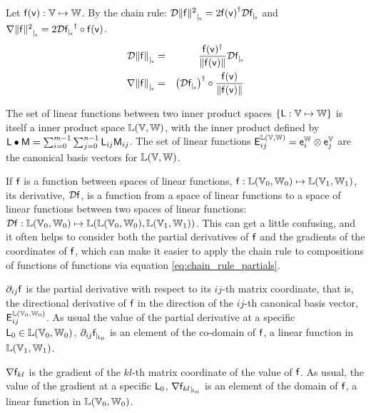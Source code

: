 Let $\mathsf{f}(\mathsf{v}) : \mathbb{V} \mapsto \mathbb{W}$.
By the chain rule:
${\mathcal{D}{\| \mathsf{f} \|^2}_{\mid_{\mathsf{v}}}}  =  2 {\mathsf{f}(\mathsf{v})}^{\dagger} {\mathcal{D}{\mathsf{f}}_{\mid_{\mathsf{v}}}} $
and
${\mathbf \nabla}{\| \mathsf{f} \|^2}_{\mid_{\mathsf{v}}}  =  2 {\mathcal{D}{\mathsf{f}}_{\mid_{\mathsf{v}}}}^\dagger \circ \mathsf{f}(\mathsf{v})$.
\begin{eqnarray}
\label{eq:norm_derivative}
{\mathcal{D}{\| \mathsf{f}\|}_{\mid_{\mathsf{v}}}}
& = &
\frac{\mathsf{f}(\mathsf{v})^\dagger}{\| \mathsf{f}(\mathsf{v}) \|} {\mathcal{D}{\mathsf{f}}_{\mid_{\mathsf{v}}}}  \\
{\mathbf \nabla}{\| \mathsf{f} \|}_{\mid_{\mathsf{v}}}
& = &
\left({\mathcal{D}{\mathsf{f}}_{\mid_{\mathsf{v}}}}\right)^\dagger \circ  \frac{\mathsf{f}(\mathsf{v})}{ \| \mathsf{f}(\mathsf{v})  \|}
\label{eq:norm_gradient}
\end{eqnarray}

\label{sec:Linear-function-valued-functions}

The set of linear functions between two inner product spaces
$\{ \mathsf{L} : \mathbb{V} \mapsto \mathbb{W} \}$
is itself a inner product space $\mathbb{L}(\mathbb{V},\mathbb{W})$,
with the inner product defined by
$\mathsf{L} \bullet \mathsf{M} = \sum_{i=0}^{m-1} \sum_{j=0}^{n-1} \mathsf{L}_{ij} \mathsf{M}_{ij}$.
The set of linear functions
$\mathsf{E}_{ij}^{\mathbb{L}(\mathbb{V},\mathbb{W})}  = \mathsf{e}_i^{\mathbb{W}} \otimes \mathsf{e}_j^{\mathbb{V}}$
are the canonical basis vectors for $\mathbb{L}(\mathbb{V},\mathbb{W})$.

If $\mathsf{f}$ is a function between spaces of linear functions,
$\mathsf{f} : \mathbb{L}(\mathbb{V}_0,\mathbb{W}_0) \mapsto \mathbb{L}(\mathbb{V}_1,\mathbb{W}_1)$,
its derivative, ${\mathcal{D}{\mathsf{f}}}$,
is a function from a space of linear functions
to a space of linear functions between two
spaces of linear functions:
${\mathcal{D}{\mathsf{f}}} : \mathbb{L}(\mathbb{V}_0,\mathbb{W}_0) \mapsto
\mathbb{L}(\mathbb{L}(\mathbb{V}_0,\mathbb{W}_0), \mathbb{L}(\mathbb{V}_1,\mathbb{W}_1))$.
This can get a little confusing,
and it often helps to consider both the partial derivatives of $\mathsf{f}$
and the gradients of the coordinates of $\mathsf{f}$,
which can make it easier to apply the chain rule to
compositions of functions of functions via equation \ref{eq:chain_rule_partials}.

${\partial}_{ij}{\mathsf{f}}$ is the partial derivative with respect to its $ij$-th matrix coordinate,
that is, the directional derivative of $\mathsf{f}$ in the direction
of the $ij$-th canonical basis vector, $\mathsf{E}_{ij}^{\mathbb{L}(\mathbb{V}_0,\mathbb{W}_0)}$.
As usual the value of the partial derivative at a specific
$\mathsf{L}_0 \in  \mathbb{L}(\mathbb{V}_0,\mathbb{W}_0)$,
${\partial}_{ij}{\mathsf{f}}_{\mid_{\mathsf{L}_0}}$ is an element of the co-domain of $\mathsf{f}$,
a linear function in  $\mathbb{L}(\mathbb{V}_1,\mathbb{W}_1)$.

${\mathbf \nabla}{\mathsf{f}_{kl}}$ is the gradient of the $kl$-th matrix coordinate of the value of $\mathsf{f}$.
As usual, the value of the gradient at a specific $\mathsf{L}_0$,
${\mathbf \nabla}{\mathsf{f}_{kl}}_{\mid_{\mathsf{L}_0}}$ is an element of the domain of $\mathsf{f}$,
a linear function in $\mathbb{L}(\mathbb{V}_0,\mathbb{W}_0)$.

